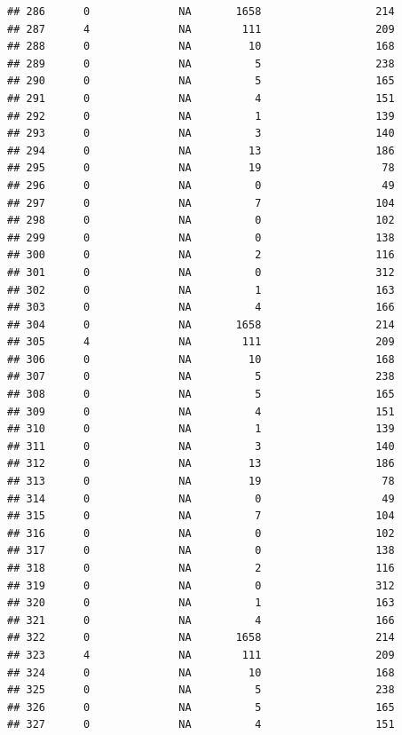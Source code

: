 \documentclass[
]{article}
\begin{document}
\begin{verbatim}
## 286      0              NA       1658                  214
## 287      4              NA        111                  209
## 288      0              NA         10                  168
## 289      0              NA          5                  238
## 290      0              NA          5                  165
## 291      0              NA          4                  151
## 292      0              NA          1                  139
## 293      0              NA          3                  140
## 294      0              NA         13                  186
## 295      0              NA         19                   78
## 296      0              NA          0                   49
## 297      0              NA          7                  104
## 298      0              NA          0                  102
## 299      0              NA          0                  138
## 300      0              NA          2                  116
## 301      0              NA          0                  312
## 302      0              NA          1                  163
## 303      0              NA          4                  166
## 304      0              NA       1658                  214
## 305      4              NA        111                  209
## 306      0              NA         10                  168
## 307      0              NA          5                  238
## 308      0              NA          5                  165
## 309      0              NA          4                  151
## 310      0              NA          1                  139
## 311      0              NA          3                  140
## 312      0              NA         13                  186
## 313      0              NA         19                   78
## 314      0              NA          0                   49
## 315      0              NA          7                  104
## 316      0              NA          0                  102
## 317      0              NA          0                  138
## 318      0              NA          2                  116
## 319      0              NA          0                  312
## 320      0              NA          1                  163
## 321      0              NA          4                  166
## 322      0              NA       1658                  214
## 323      4              NA        111                  209
## 324      0              NA         10                  168
## 325      0              NA          5                  238
## 326      0              NA          5                  165
## 327      0              NA          4                  151

\end{verbatim}
\end{document}
